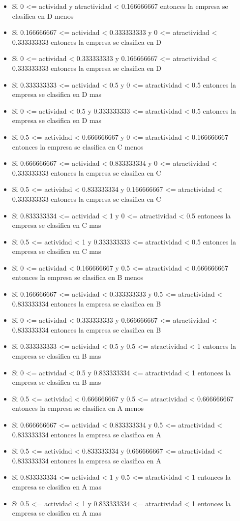 \begin{itemize}
	\item Si 0 <= actividad y atractividad < 0.166666667 entonces la empresa se clasifica en D menos
	\item Si 0.166666667 <= actividad < 0.333333333 y 0 <= atractividad < 0.333333333 entonces la empresa se clasifica en D
	\item Si 0 <= actividad < 0.333333333 y 0.166666667 <= atractividad < 0.333333333 entonces la empresa se clasifica en D
	\item Si 0.333333333 <= actividad < 0.5 y 0 <= atractividad < 0.5 entonces la empresa se clasifica en D mas
	\item Si 0 <= actividad < 0.5 y 0.333333333 <= atractividad < 0.5 entonces la empresa se clasifica en D mas
	\item Si 0.5 <= actividad < 0.666666667 y 0 <= atractividad < 0.166666667 entonces la empresa se clasifica en C menos
	\item Si 0.666666667 <= actividad < 0.833333334 y 0 <= atractividad < 0.333333333 entonces la empresa se clasifica en C
	\item Si 0.5 <= actividad < 0.833333334 y 0.166666667 <= atractividad < 0.333333333 entonces la empresa se clasifica en C
	\item Si 0.833333334 <= actividad < 1 y 0 <= atractividad < 0.5 entonces la empresa se clasifica en C mas
	\item Si 0.5 <= actividad < 1 y 0.333333333 <= atractividad < 0.5 entonces la empresa se clasifica en C mas
	\item Si 0 <= actividad < 0.166666667 y 0.5 <= atractividad < 0.666666667 entonces la empresa se clasifica en B menos
	\item Si 0.166666667 <= actividad < 0.333333333 y 0.5 <= atractividad < 0.833333334 entonces la empresa se clasifica en B
	\item Si 0 <= actividad < 0.333333333 y 0.666666667 <= atractividad < 0.833333334 entonces la empresa se clasifica en B
	\item Si 0.333333333 <= actividad < 0.5 y 0.5 <= atractividad < 1 entonces la empresa se clasifica en B mas
	\item Si 0 <= actividad < 0.5 y 0.833333334 <= atractividad < 1 entonces la empresa se clasifica en B mas
	\item Si 0.5 <= actividad < 0.666666667 y 0.5 <= atractividad < 0.666666667 entonces la empresa se clasifica en A menos
	\item Si 0.666666667 <= actividad < 0.833333334 y 0.5 <= atractividad < 0.833333334 entonces la empresa se clasifica en A
	\item Si 0.5 <= actividad < 0.833333334 y 0.666666667 <= atractividad < 0.833333334 entonces la empresa se clasifica en A
	\item Si 0.833333334 <= actividad < 1 y 0.5 <= atractividad < 1 entonces la empresa se clasifica en A mas
	\item Si 0.5 <= actividad < 1 y 0.833333334 <= atractividad < 1 entonces la empresa se clasifica en A mas
\end{itemize}


